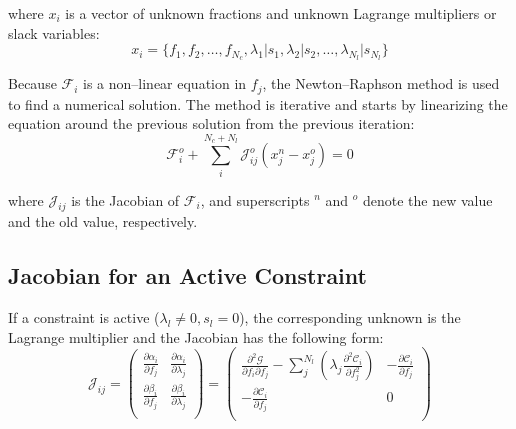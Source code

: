 \documentclass{article}
\begin{document}
\noindent where $x_i$ is a vector of unknown fractions and unknown Lagrange
multipliers or slack variables:
\begin{equation}
\label{eq:19}
    x_i
  =
    \{ f_1, f_2, \ldots, f_{N_c}, \lambda_1 | s_1, \lambda_2 | s_2,
    \ldots, \lambda_{N_l} | s_{N_l} \}
\end{equation}

\indent Because $\mathcal{F}_i$ is a non--linear equation in $f_j$,
the Newton--Raphson method is used to find a numerical solution. The method is
iterative and starts by linearizing the equation around the previous solution
from the previous iteration:
\begin{equation}
\label{eq:20}
    \mathcal{F}_i^o + \sum_{i}^{N_c + N_l} \mathcal{J}_{ij}^o (x_j^n - x_j^o) = 0
\end{equation}

\noindent where $\mathcal{J}_{ij}$ is the Jacobian of $\mathcal{F}_i$, and
superscripts $^n$ and $^o$ denote the new value and the old value, respectively.

\subsection{Jacobian for an Active Constraint}
\label{sec:jacobianActive}

\noindent If a constraint is active ($\lambda_l \ne 0, s_l = 0$), the
corresponding unknown is the Lagrange multiplier and the Jacobian has the
following form:
\begin{equation}
\label{eq:21}
    \mathcal{J}_{ij}
  =
    \begin{pmatrix}
        \frac{\partial \alpha_i}{\partial f_j}
      & \frac{\partial \alpha_i}{\partial \lambda_j} \\
        \frac{\partial \beta_i}{\partial f_j}
      & \frac{\partial \beta_i}{\partial \lambda_j} \\
    \end{pmatrix}
  =
    \begin{pmatrix}
        \frac{\partial^2 \mathcal{G}}{\partial f_i \partial f_j}
      - \sum_j^{N_l} \left( \lambda_j \frac{\partial^2 \mathcal{C}_i}{\partial f_j^2} \right)
      & -\frac{\partial \mathcal{C}_i}{\partial f_j} \\
        -\frac{\partial \mathcal{C}_i}{\partial f_j}
      & 0 \\
    \end{pmatrix}
\end{equation}
\end{document}
